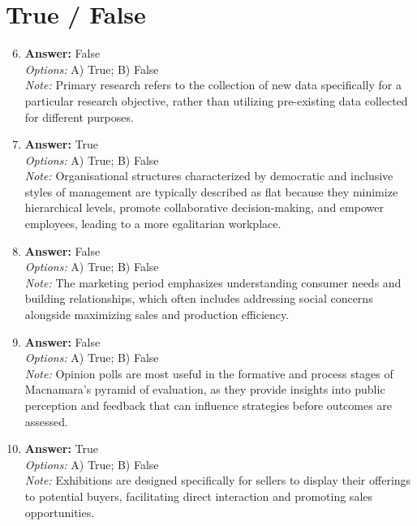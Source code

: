 \documentclass[12pt]{article}
\begin{document}
\section*{True / False}
\begin{enumerate}[label=\arabic*.]
\setcounter{enumi}{5}
\item \textbf{Answer:} False
\\ \textit{Options:} A) True; B) False
\\ \textit{Note:} Primary research refers to the collection of new data specifically for a particular research objective, rather than utilizing pre-existing data collected for different purposes.
\item \textbf{Answer:} True
\\ \textit{Options:} A) True; B) False
\\ \textit{Note:} Organisational structures characterized by democratic and inclusive styles of management are typically described as flat because they minimize hierarchical levels, promote collaborative decision-making, and empower employees, leading to a more egalitarian workplace.
\item \textbf{Answer:} False
\\ \textit{Options:} A) True; B) False
\\ \textit{Note:} The marketing period emphasizes understanding consumer needs and building relationships, which often includes addressing social concerns alongside maximizing sales and production efficiency.
\item \textbf{Answer:} False
\\ \textit{Options:} A) True; B) False
\\ \textit{Note:} Opinion polls are most useful in the formative and process stages of Macnamara's pyramid of evaluation, as they provide insights into public perception and feedback that can influence strategies before outcomes are assessed.
\item \textbf{Answer:} True
\\ \textit{Options:} A) True; B) False
\\ \textit{Note:} Exhibitions are designed specifically for sellers to display their offerings to potential buyers, facilitating direct interaction and promoting sales opportunities.
\end{enumerate}
\end{document}
